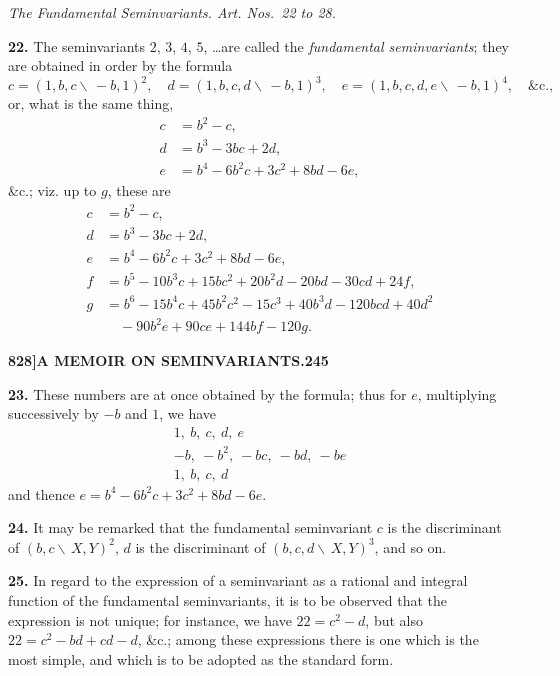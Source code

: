 \documentclass[12pt,a4paper]{article}
\theoremstyle{definition}
\begin{document}
\begin{center}
\textit{The Fundamental Seminvariants. Art. Nos.~22 to 28.}
\end{center}

\noindent\textbf{22.} The seminvariants $2$, $3$, $4$, $5$, \dots are called the \textit{fundamental seminvariants}; they are obtained in order by the formula
\[
c = (1, b, c \!\!\!\backslash\, -b, 1)^2, \quad d = (1, b, c, d \!\!\!\backslash\, -b, 1)^3, \quad e = (1, b, c, d, e \!\!\!\backslash\, -b, 1)^4, \quad \&\text{c.},
\]
or, what is the same thing,
\begin{align*}
c &= b^2 - c, \\
d &= b^3 - 3bc + 2d, \\
e &= b^4 - 6b^2c + 3c^2 + 8bd - 6e,
\end{align*}
\&c.; viz. up to $g$, these are
\begin{align*}
c &= b^2 - c, \\
d &= b^3 - 3bc + 2d, \\
e &= b^4 - 6b^2c + 3c^2 + 8bd - 6e, \\
f &= b^5 - 10b^3c + 15bc^2 + 20b^2d - 20bd - 30cd + 24f, \\
g &= b^6 - 15b^4c + 45b^2c^2 - 15c^3 + 40b^3d - 120bcd + 40d^2 \\
  &\quad - 90b^2e + 90ce + 144bf - 120g.
\end{align*}

\newpage
\setcounter{page}{245}

\noindent\textbf{828]}\hfill\textbf{A MEMOIR ON SEMINVARIANTS.}\hfill\textbf{245}

\bigskip

\noindent\textbf{23.} These numbers are at once obtained by the formula; thus for $e$, multiplying successively by $-b$ and $1$, we have
\begin{align*}
1,\ b,\ c,\ d,\ e \\
-b,\ -b^2,\ -bc,\ -bd,\ -be \\
1,\ b,\ c,\ d
\end{align*}
and thence $e = b^4 - 6b^2c + 3c^2 + 8bd - 6e$.

\noindent\textbf{24.} It may be remarked that the fundamental seminvariant $c$ is the discriminant of $(b, c \!\!\!\backslash\, X, Y)^2$, $d$ is the discriminant of $(b, c, d \!\!\!\backslash\, X, Y)^3$, and so on.

\noindent\textbf{25.} In regard to the expression of a seminvariant as a rational and integral function of the fundamental seminvariants, it is to be observed that the expression is not unique; for instance, we have $22 = c^2 - d$, but also $22 = c^2 - bd + cd - d$, \&c.; among these expressions there is one which is the most simple, and which is to be adopted as the standard form.
\end{document}
